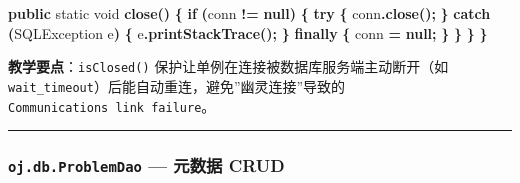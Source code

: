 \documentclass[
  11pt,
]{ctexart}
\newenvironment{Shaded}{\begin{snugshade}}{\end{snugshade}}
\newcommand{\BuiltInTok}[1]{#1}
\newcommand{\ControlFlowTok}[1]{\textcolor[rgb]{0.13,0.29,0.53}{\textbf{#1}}}
\newcommand{\DataTypeTok}[1]{\textcolor[rgb]{0.13,0.29,0.53}{#1}}
\newcommand{\FunctionTok}[1]{\textcolor[rgb]{0.13,0.29,0.53}{\textbf{#1}}}
\newcommand{\KeywordTok}[1]{\textcolor[rgb]{0.13,0.29,0.53}{\textbf{#1}}}
\newcommand{\NormalTok}[1]{#1}
\newcommand{\OperatorTok}[1]{\textcolor[rgb]{0.81,0.36,0.00}{\textbf{#1}}}
\begin{document}
\begin{Shaded}
\begin{Highlighting}[]
    \KeywordTok{public} \DataTypeTok{static} \DataTypeTok{void} \FunctionTok{close}\OperatorTok{()} \OperatorTok{\{}
        \ControlFlowTok{if} \OperatorTok{(}\NormalTok{conn }\OperatorTok{!=} \KeywordTok{null}\OperatorTok{)} \OperatorTok{\{}
            \ControlFlowTok{try} \OperatorTok{\{}
\NormalTok{                conn}\OperatorTok{.}\FunctionTok{close}\OperatorTok{();}
            \OperatorTok{\}} \ControlFlowTok{catch} \OperatorTok{(}\BuiltInTok{SQLException}\NormalTok{ e}\OperatorTok{)} \OperatorTok{\{}
\NormalTok{                e}\OperatorTok{.}\FunctionTok{printStackTrace}\OperatorTok{();}
            \OperatorTok{\}} \ControlFlowTok{finally} \OperatorTok{\{}
\NormalTok{                conn }\OperatorTok{=} \KeywordTok{null}\OperatorTok{;}
            \OperatorTok{\}}
        \OperatorTok{\}}
    \OperatorTok{\}}
\OperatorTok{\}}
\end{Highlighting}
\end{Shaded}

\textbf{教学要点}：\texttt{isClosed()}
保护让单例在连接被数据库服务端主动断开（如
\texttt{wait\_timeout}）后能自动重连，避免''幽灵连接''导致的
\texttt{Communications\ link\ failure}。

\begin{center}\rule{0.5\linewidth}{0.5pt}\end{center}

\hypertarget{oj.db.problemdao-ux5143ux6570ux636e-crud}{%
\subsubsection{\texorpdfstring{\texttt{oj.db.ProblemDao} --- 元数据
CRUD}{oj.db.ProblemDao --- 元数据 CRUD}}\label{oj.db.problemdao-ux5143ux6570ux636e-crud}}
\end{document}
